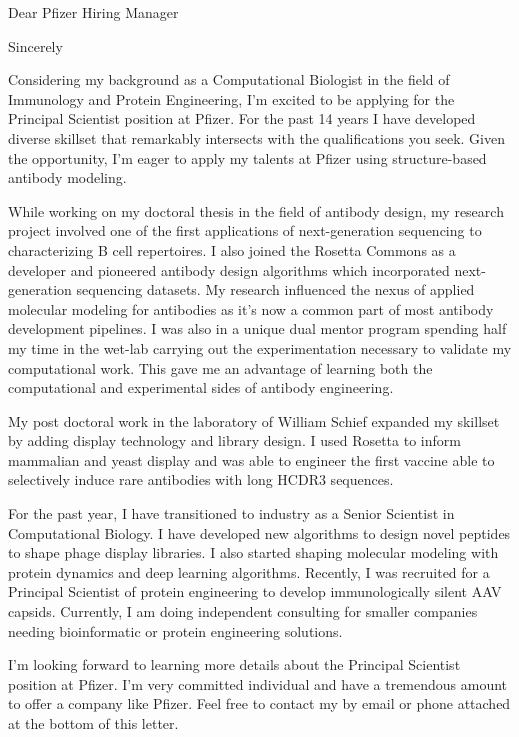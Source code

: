 \documentclass[11pt,a4paper,sans]{moderncv}        %
\title{}                               %
\begin{document}
\date{ 2019}
\opening{Dear Pfizer Hiring Manager}
\closing{Sincerely}
\makelettertitle


Considering my background as a Computational Biologist in the field of Immunology and Protein Engineering, I’m excited to be applying for the
Principal Scientist position at Pfizer. 
For the past 14 years I have developed diverse skillset that remarkably intersects with the qualifications you seek. Given the opportunity, 
I'm eager to apply my talents at Pfizer using structure-based antibody modeling.

\vspace{0.1in}
While working on my doctoral thesis in the field of antibody design, my research project involved one of the first applications of next-generation 
sequencing to characterizing B cell repertoires.
I also joined the Rosetta Commons as a developer and pioneered antibody design algorithms which incorporated next-generation sequencing datasets. My research influenced the nexus of applied molecular modeling for antibodies as it's now a common part of most antibody development pipelines. I was also in a unique dual 
mentor program spending half my time in the wet-lab carrying out the experimentation necessary to validate my computational work. This gave me an advantage 
of learning both the computational and experimental sides of antibody engineering.

\vspace{0.1in}
My post doctoral work in the laboratory of William Schief expanded my skillset by adding display technology and library design. I used Rosetta to inform 
mammalian and yeast 
display and was able to engineer the first vaccine able to selectively induce rare antibodies with long HCDR3 sequences.  

For the past year, I have transitioned to industry as a 
Senior Scientist in Computational Biology. I have developed new algorithms to design novel peptides to shape phage display libraries. I also started shaping molecular modeling with protein dynamics and deep learning algorithms. Recently, I was recruited for a Principal Scientist of protein engineering to develop immunologically silent AAV capsids. Currently, I am doing independent consulting for smaller companies needing bioinformatic or protein engineering solutions. 

\vspace{0.1in}
I’m looking forward to learning more details about the Principal Scientist position at Pfizer. I'm very committed individual and have a tremendous amount
 to offer a company like Pfizer.
Feel free to contact my by email or phone attached at the bottom of this letter. 

\makeletterclosing
\end{document}
